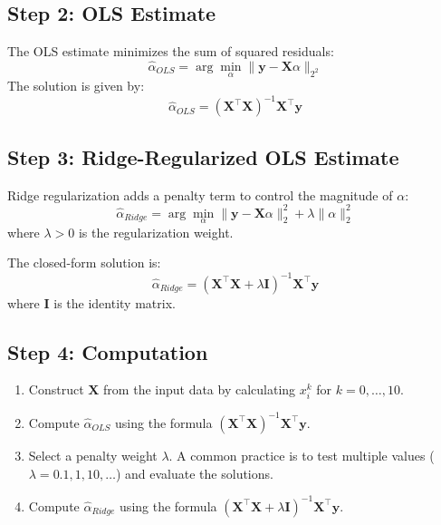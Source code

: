 \subsection*{Step 2: OLS Estimate}
The OLS estimate minimizes the sum of squared residuals:
\begin{equation}
\hat{\alpha}_{OLS} = \arg \min_\alpha \|\mathbf{y} - \mathbf{X} \alpha\|_{2^{2}}
\end{equation}
The solution is given by:
\begin{equation}
\hat{\alpha}_{OLS} = (\mathbf{X}^\top \mathbf{X})^{-1} \mathbf{X}^\top \mathbf{y}
\end{equation}

\subsection*{Step 3: Ridge-Regularized OLS Estimate}
Ridge regularization adds a penalty term to control the magnitude of $\alpha$:
\begin{equation}
\hat{\alpha}_{Ridge} = \arg \min_\alpha \|\mathbf{y} - \mathbf{X} \alpha\|_2^2 + \lambda \|\alpha\|_2^2
\end{equation}
where $\lambda > 0$ is the regularization weight.

The closed-form solution is:
\begin{equation}
\hat{\alpha}_{Ridge} = (\mathbf{X}^\top \mathbf{X} + \lambda \mathbf{I})^{-1} \mathbf{X}^\top \mathbf{y}
\end{equation}
where $\mathbf{I}$ is the identity matrix.

\subsection*{Step 4: Computation}
\begin{enumerate}
    \item Construct $\mathbf{X}$ from the input data by calculating $x_i^k$ for $k = 0, \dots, 10$.
    \item Compute $\hat{\alpha}_{OLS}$ using the formula $(\mathbf{X}^\top \mathbf{X})^{-1} \mathbf{X}^\top \mathbf{y}$.
    \item Select a penalty weight $\lambda$. A common practice is to test multiple values ($ \lambda = 0.1, 1, 10, \dots $) and evaluate the solutions.
    \item Compute $\hat{\alpha}_{Ridge}$ using the formula $(\mathbf{X}^\top \mathbf{X} + \lambda \mathbf{I})^{-1} \mathbf{X}^\top \mathbf{y}$.
\end{enumerate}

